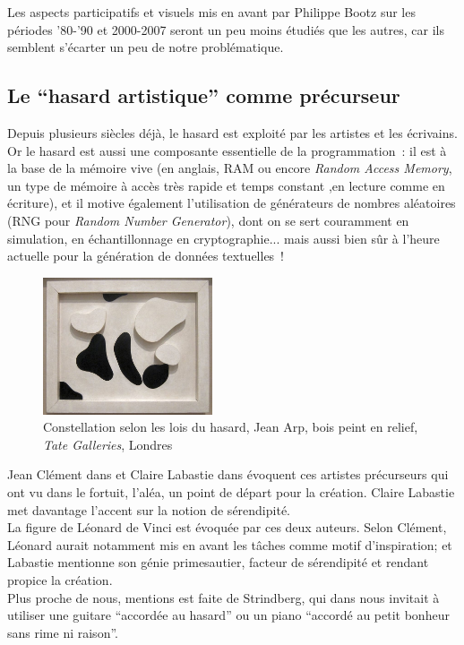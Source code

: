 \documentclass{article}
\begin{document}
		 Les aspects participatifs et visuels mis en avant par Philippe Bootz sur les périodes '80-'90 et 2000-2007 seront un peu moins étudiés que les autres, car ils semblent s'écarter un peu de notre problématique.
		\subsection{Le ``hasard artistique'' comme précurseur}
			Depuis plusieurs siècles déjà, le hasard est exploité par les artistes et les écrivains. Or le hasard est aussi une composante essentielle de la programmation : il est à la base de la mémoire vive (en anglais, RAM ou encore \textit{Random Access Memory}, un type de mémoire à accès très rapide et temps constant ,en lecture comme en écriture), et il motive également l'utilisation de générateurs de nombres aléatoires (RNG pour \textit{Random Number Generator}), dont on se sert couramment en simulation, en échantillonnage en cryptographie... mais aussi bien sûr à l'heure actuelle pour la génération de données textuelles !\\
			
			\begin{figure}
				\centering
				\includegraphics[width=5cm]{arp_hasard.jpg}
				\caption{Constellation selon les lois du hasard, Jean Arp, bois peint en relief, \textit{Tate Galleries}, Londres}
			\end{figure}
			
			Jean Clément dans \cite{clement2011} et Claire Labastie dans \cite{labastie2016} évoquent ces artistes précurseurs qui ont vu dans le fortuit, l'aléa, un point de départ pour la création. Claire Labastie met davantage l'accent sur la notion de sérendipité.\\
			
			La figure de Léonard de Vinci est évoquée par ces deux auteurs. Selon Clément, Léonard aurait notamment mis en avant les tâches comme motif d'inspiration; et Labastie mentionne son génie primesautier, facteur de sérendipité et rendant propice la création.\\
			Plus proche de nous, mentions est faite de Strindberg, qui dans \cite{strindberg1990} nous invitait à utiliser une guitare ``accordée au hasard'' ou un piano ``accordé au petit bonheur sans rime ni raison''.\\
					
\end{document}
